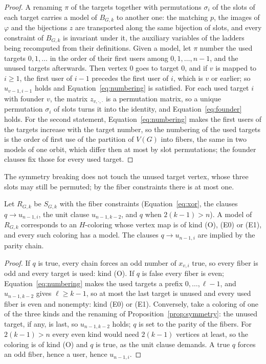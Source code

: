 \begin{proof}
A renaming $\pi$ of the targets together with permutations $\sigma_i$ of the slots of each target carries a model of $B_{G,k}$ to another one: the matching $p$, the images of $\varphi$ and the bijections $z$ are
transported along the same bijection of slots, and every constraint of $B_{G,k}$ is invariant under it, the auxiliary variables of the ladders being recomputed from their definitions. Given a model, let $\pi$ number the used targets $0, 1, \dots$ in the order of their first users among
$0, 1, \dots, n-1$, and the unused targets afterwards. Then vertex $0$ goes to target $0$, and if $v$ is mapped to $i \ge 1$, the first user of $i-1$ precedes the first user of $i$, which is $v$ or earlier;
so $u_{v-1,i-1}$ holds and Equation~\eqref{eq:numbering} is satisfied. For each used target $i$ with founder $v$, the matrix $z_{v,\cdot,\cdot}$ is a permutation matrix, so a unique permutation
$\sigma_i$ of slots turns it into the identity, and Equation~\eqref{eq:founder} holds. For the second statement, Equation~\eqref{eq:numbering} makes the first users of the targets increase with the target
number, so the numbering of the used targets is the order of first use of the partition of $V(G)$ into fibers, the same in two models of one orbit, which differ then at most by slot permutations;
the founder clauses fix those for every used target.
\end{proof}

The symmetry breaking does not touch the unused target vertex, whose three slots may still be permuted; by the fiber constraints there is at most one.

\begin{proposition}\label{prop:fibers}
Let $R_{G,k}$ be $S_{G,k}$ with the fiber constraints (Equation~\eqref{eq:xor}, the clauses $q \to u_{n-1,i}$, the unit clause $u_{n-1,k-2}$, and $q$ when $2(k-1) > n$). A model of $R_{G,k}$ corresponds to
an $H$-coloring whose vertex map is of kind (O), (E0) or (E1), and every such coloring has a model. The clauses $q \to u_{n-1,i}$ are implied by the parity chain.
\end{proposition}

\begin{proof}
If $q$ is true, every chain forces an odd number of $x_{v,i}$ true, so every fiber is odd and every target is used: kind (O). If $q$ is false every fiber is even; Equation~\eqref{eq:numbering} makes the used targets a
prefix $0, \dots, \ell - 1$, and $u_{n-1,k-2}$ gives $\ell \ge k-1$, so at most the last target is unused and every used fiber is even and nonempty: kind (E0) or (E1). Conversely, take a
coloring of one of the three kinds and the renaming of Proposition~\ref{prop:symmetry}: the unused target, if any, is last, so $u_{n-1,k-2}$ holds; $q$ is set to the parity of the fibers. For $2(k-1) > n$ every even
kind would need $2(k-1)$ vertices at least, so the coloring is of kind (O) and $q$ is true, as the unit clause demands. A true $q$ forces an odd fiber, hence a user, hence $u_{n-1,i}$.
\end{proof}

